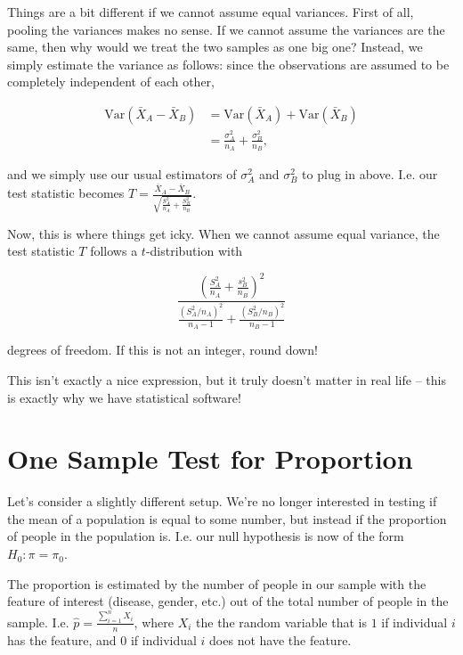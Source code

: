 \documentclass[]{book}
\theoremstyle{definition}
\theoremstyle{definition}
\theoremstyle{definition}
\theoremstyle{remark}
\begin{document}
Things are a bit different if we cannot assume equal variances. First of all, pooling the variances makes no sense. If we cannot assume the variances are the same, then why would we treat the two samples as one big one? Instead, we simply estimate the variance as follows: since the observations are assumed to be completely independent of each other,

\begin{align*}
  \text{Var}(\bar{X}_A - \bar{X}_B) &= \text{Var}(\bar{X}_A) + \text{Var}(\bar{X}_B) \\
                              &= \frac{\sigma_A^2}{n_A} + \frac{\sigma_B^2}{n_B},
\end{align*}

and we simply use our usual estimators of \(\sigma_A^2\) and \(\sigma_B^2\) to plug in above. I.e. our test statistic becomes \(T = \frac{\bar{X}_A - \bar{X}_B}{\sqrt{\frac{S_A^2}{n_A} + \frac{S_B^2}{n_B}}}\).

Now, this is where things get icky. When we cannot assume equal variance, the test statistic \(T\) follows a \(t\)-distribution with

\begin{equation}
  \frac{\left(\frac{S_A^2}{n_A} + \frac{s_B^2}{n_B}\right)^2}{\frac{\left(S_A^2/n_A\right)^2}{n_A - 1} + \frac{\left(S_B^2/n_B\right)^2}{n_B - 1}} \label{eq:ugly-df}
\end{equation}

degrees of freedom. If this is not an integer, round down!

This isn't exactly a nice expression, but it truly doesn't matter in real life -- this is exactly why we have statistical software!

\hypertarget{one-sample-test-for-proportion}{%
\section{One Sample Test for Proportion}\label{one-sample-test-for-proportion}}

Let's consider a slightly different setup. We're no longer interested in testing if the mean of a population is equal to some number, but instead if the proportion of people in the population is. I.e. our null hypothesis is now of the form \(H_0: \pi = \pi_0\).

The proportion is estimated by the number of people in our sample with the feature of interest (disease, gender, etc.) out of the total number of people in the sample. I.e. \(\hat{p} = \frac{\sum_{i = 1}^n X_i}{n}\), where \(X_i\) the the random variable that is \(1\) if individual \(i\) has the feature, and \(0\) if individual \(i\) does not have the feature.
\end{document}
